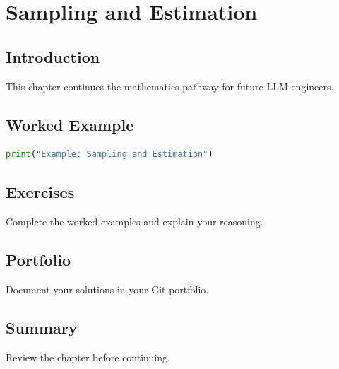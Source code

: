 \chapter{Sampling and Estimation}
\label{chap:vol4-28}



\section{Introduction}
This chapter continues the mathematics pathway for future LLM engineers.

\section{Worked Example}
\begin{lstlisting}[language=Python]
print("Example: Sampling and Estimation")
\end{lstlisting}

\section{Exercises}
\begin{exercise}
Complete the worked examples and explain your reasoning.
\end{exercise}

\section{Portfolio}
Document your solutions in your Git portfolio.

\section{Summary}
Review the chapter before continuing.
